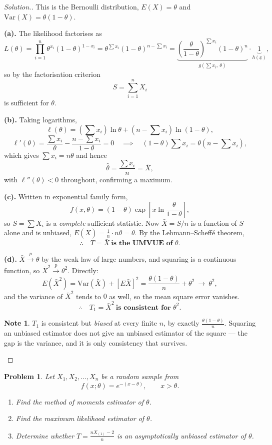 \documentclass[12pt,a4paper]{report}
\theoremstyle{definition}
\newtheorem{note}[thm]{Note}
\theoremstyle{plain}
\newtheorem{problemx}{Problem}[section]
\newenvironment{problem}{\begin{problemx}}{\end{problemx}}
\newenvironment{solution}
  {\renewcommand{\qedsymbol}{}\begin{proof}[\textit{Solution}.]}
  {\end{proof}}
\begin{document}
\begin{solution}
This is the Bernoulli distribution, $E(X)=\theta$ and
$\text{Var}(X)=\theta(1-\theta)$.

\textbf{(a).} The likelihood factorises as
\[L(\theta)=\prod_{i=1}^n\theta^{x_i}(1-\theta)^{1-x_i}
=\theta^{\sum x_i}(1-\theta)^{n-\sum x_i}
=\underbrace{\left(\frac{\theta}{1-\theta}\right)^{\sum x_i}
(1-\theta)^n}_{g\left(\sum x_i,\ \theta\right)}\cdot\underbrace{1}_{h(\underline{x})},\]
so by the factorisation criterion
\[S=\sum_{i=1}^nX_i\]
is sufficient for $\theta$.

\textbf{(b).} Taking logarithms,
\[\ell(\theta)=\left(\sum x_i\right)\ln\theta
+\left(n-\sum x_i\right)\ln(1-\theta),\]
\[\ell'(\theta)=\frac{\sum x_i}{\theta}-\frac{n-\sum x_i}{1-\theta}=0
\quad\implies\quad(1-\theta)\sum x_i=\theta\left(n-\sum x_i\right),\]
which gives $\sum x_i=n\theta$ and hence
\[\hat\theta=\frac{\sum x_i}{n}=\bar X,\]
with $\ell''(\theta)<0$ throughout, confirming a maximum.

\textbf{(c).} Written in exponential family form,
\[f(x,\theta)=(1-\theta)\exp\left[x\ln\frac{\theta}{1-\theta}\right],\]
so $S=\sum X_i$ is a \emph{complete} sufficient statistic. Now $\bar X=S/n$ is a
function of $S$ alone and is unbiased,
$E\left(\bar X\right)=\frac{1}{n}\cdot n\theta=\theta$. By the
Lehmann--Scheff\'e theorem,
\[\therefore\quad T=\bar X\ \textbf{is the UMVUE of }\theta.\]

\textbf{(d).} $\bar X\stackrel{p}{\longrightarrow}\theta$ by the weak law of
large numbers, and squaring is a continuous function, so
$\bar X^2\stackrel{p}{\longrightarrow}\theta^2$. Directly:
\[E\left(\bar X^2\right)=\text{Var}\left(\bar X\right)+\left[E\bar X\right]^2
=\frac{\theta(1-\theta)}{n}+\theta^2\ \longrightarrow\ \theta^2,\]
and the variance of $\bar X^2$ tends to $0$ as well, so the mean square error
vanishes.
\[\therefore\quad T_1=\bar X^2\ \textbf{is consistent for }\theta^2.\]

\begin{note}
$T_1$ is consistent but \emph{biased} at every finite $n$, by exactly
$\frac{\theta(1-\theta)}{n}$. Squaring an unbiased estimator does not give an
unbiased estimator of the square --- the gap is the variance, and it is only
consistency that survives.
\end{note}
\end{solution}

\begin{problem}
Let $X_1,X_2,\ldots,X_n$ be a random sample from
\[f(x;\theta)=e^{-(x-\theta)},\qquad x>\theta.\]
\begin{enumerate}
\item[(a).] Find the method of moments estimator of $\theta$.
\item[(b).] Find the maximum likelihood estimator of $\theta$.
\item[(c).] Determine whether $T=\frac{nX_{(1)}-2}{n}$ is an asymptotically
unbiased estimator of $\theta$.
\end{enumerate}
\end{problem}
\end{document}
